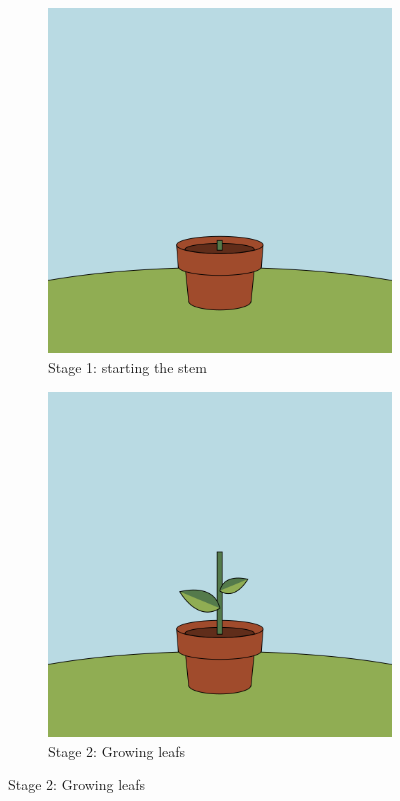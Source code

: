\begin{figure}[H]
    \centering
    \begin{subfigure}[t]{.35\textwidth}
        \centering

        \includegraphics[width=\linewidth]{Figures/day_2/stage_1.png}
        \caption{Stage 1: starting the stem}
        \label{fig: animation stage 1}

    \end{subfigure}
    \hspace{1cm}
    \begin{subfigure}[t]{.35\textwidth}
        \centering

        \includegraphics[width=\linewidth]{Figures/day_2/stage_2.png}
        \caption{Stage 2: Growing leafs}
        \label{fig: animation stage 2}


\end{subfigure}
\end{figure}
